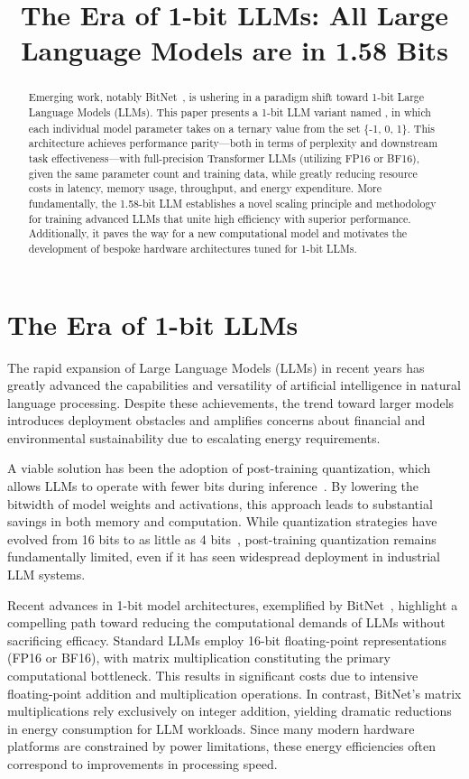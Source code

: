 \title{The Era of 1-bit LLMs: All Large Language Models are in 1.58 Bits}

\begin{abstract}
Emerging work, notably BitNet~\cite{bitnet}, is ushering in a paradigm shift toward 1-bit Large Language Models (LLMs). This paper presents a 1-bit LLM variant named \textbf{}, in which each individual model parameter takes on a ternary value from the set \{-1, 0, 1\}. This architecture achieves performance parity—both in terms of perplexity and downstream task effectiveness—with full-precision Transformer LLMs (utilizing FP16 or BF16), given the same parameter count and training data, while greatly reducing resource costs in latency, memory usage, throughput, and energy expenditure. More fundamentally, the 1.58-bit LLM establishes a novel scaling principle and methodology for training advanced LLMs that unite high efficiency with superior performance. Additionally, it paves the way for a new computational model and motivates the development of bespoke hardware architectures tuned for 1-bit LLMs.
\end{abstract}

\section{The Era of 1-bit LLMs}

The rapid expansion of Large Language Models (LLMs) in recent years has greatly advanced the capabilities and versatility of artificial intelligence in natural language processing. Despite these achievements, the trend toward larger models introduces deployment obstacles and amplifies concerns about financial and environmental sustainability due to escalating energy requirements.

A viable solution has been the adoption of post-training quantization, which allows LLMs to operate with fewer bits during inference~\cite{smoothquant, gptq, quip, quip_sharp}. By lowering the bitwidth of model weights and activations, this approach leads to substantial savings in both memory and computation. While quantization strategies have evolved from 16 bits to as little as 4 bits~\cite{gptq, awq}, post-training quantization remains fundamentally limited, even if it has seen widespread deployment in industrial LLM systems.

Recent advances in 1-bit model architectures, exemplified by BitNet~\cite{bitnet}, highlight a compelling path toward reducing the computational demands of LLMs without sacrificing efficacy. Standard LLMs employ 16-bit floating-point representations (FP16 or BF16), with matrix multiplication constituting the primary computational bottleneck. This results in significant costs due to intensive floating-point addition and multiplication operations. In contrast, BitNet's matrix multiplications rely exclusively on integer addition, yielding dramatic reductions in energy consumption for LLM workloads. Since many modern hardware platforms are constrained by power limitations, these energy efficiencies often correspond to improvements in processing speed.

